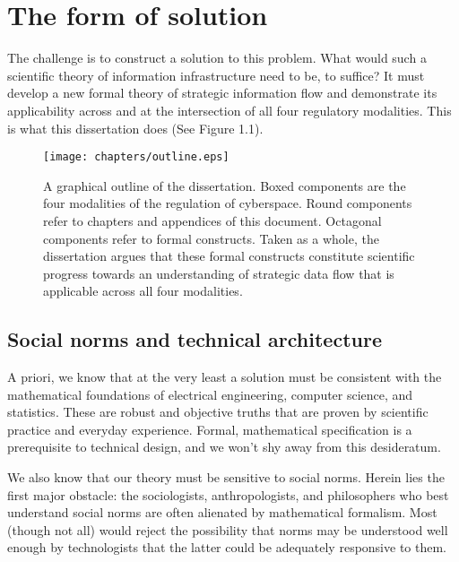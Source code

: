 \documentclass[../thesis.tex]{subfiles}
\begin{document}
 \section{The form of solution}

 The challenge is to construct a solution to this problem.
 What would such a scientific theory of information
 infrastructure need to be, to suffice?
 It must develop a new formal theory of strategic information
 flow and demonstrate its applicability across and
 at the intersection of all four regulatory modalities.
 This is what this dissertation does (See Figure 1.1).
 
 \begin{figure}
  \begin{center}
  \texttt{[image: chapters/outline.eps]}
  \label{fig:outline}
  \end{center}
\caption[Graphical outline of this dissertation]{
  A graphical outline of the dissertation.
  Boxed components are the four modalities of
  the regulation of cyberspace.
  Round components refer to chapters and appendices
  of this document.
  Octagonal components refer to formal constructs.
  Taken as a whole, the dissertation argues that
  these formal constructs constitute scientific
  progress towards an understanding of strategic
  data flow that is applicable across all four
  modalities.
  }
\end{figure}
 
 \subsection{Social norms and technical architecture}

 A priori, we know that at the very least a solution must be
 consistent with the mathematical foundations of
 electrical engineering, computer science, and statistics.
 These are robust and objective truths that are proven
 by scientific practice and everyday experience.
 Formal, mathematical specification is a prerequisite
 to technical design, and we won't shy away from this
 desideratum.

 We also know that our theory must be sensitive to social
 norms.
 Herein lies the first major obstacle: the
 sociologists, anthropologists, and philosophers who best
 understand social norms are often alienated by
 mathematical formalism.
 Most (though not all) would reject the possibility that
 norms may be understood well enough by technologists
 that the latter could be adequately responsive to them.
\end{document}
